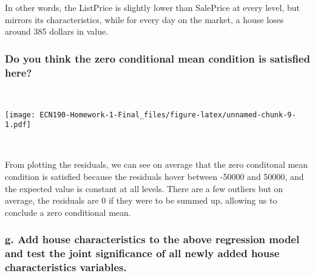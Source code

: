 \documentclass[
]{article}
\begin{document}
In other words, the ListPrice is slightly lower than SalePrice at every
level, but mirrors its characteristics, while for every day on the
market, a house loses around 385 dollars in value.

\newpage

\hypertarget{do-you-think-the-zero-conditional-mean-condition-is-satisfied-here}{%
\subsubsection{Do you think the zero conditional mean condition is
satisfied
here?}\label{do-you-think-the-zero-conditional-mean-condition-is-satisfied-here}}

~ ~

\texttt{[image: ECN190-Homework-1-Final\_files/figure-latex/unnamed-chunk-9-1.pdf]}

~ ~

From plotting the residuals, we can see on average that the zero
conditonal mean condition is satisfied because the residuals hover
between -50000 and 50000, and the expected value is constant at all
levels. There are a few outliers but on average, the residuals are 0 if
they were to be summed up, allowing us to conclude a zero conditional
mean.

\newpage

\hypertarget{g.-add-house-characteristics-to-the-above-regression-model-and-test-the-joint-significance-of-all-newly-added-house-characteristics-variables.}{%
\subsubsection{g. Add house characteristics to the above regression
model and test the joint significance of all newly added house
characteristics
variables.}\label{g.-add-house-characteristics-to-the-above-regression-model-and-test-the-joint-significance-of-all-newly-added-house-characteristics-variables.}}
\end{document}
